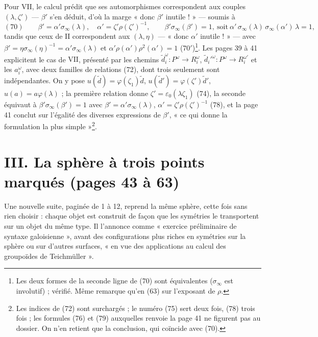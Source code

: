 \documentclass[11pt,a4paper]{article}
\begin{document}
Pour $\mathrm{VII}$, le calcul prédit que ses automorphismes correspondent aux
couples $(\lambda, \zeta')$ — $\beta'$ s'en déduit, d'où la marge « donc
$\beta'$ inutile ! » — soumis à
\[
(70)\qquad \beta' = \alpha'\sigma_\infty(\lambda),\quad \alpha' = \zeta'\rho(\zeta')^{-1}, \qquad \beta'\sigma_\infty(\beta') = 1, \ \text{soit}\ \alpha'\,\sigma_\infty(\lambda)\,\sigma_\infty(\alpha')\,\lambda = 1 ,
\]
tandis que ceux de $\mathrm{II}$ correspondent aux $(\lambda, \eta)$ — « donc
$\alpha'$ inutile ! » — avec $\beta' = \eta\sigma_\infty(\eta)^{-1} =
\alpha'\sigma_\infty(\lambda)$ et $\alpha'\rho(\alpha')\rho^2(\alpha') = 1$
(70$'$)\footnote{Les deux formes de la seconde ligne de (70) sont équivalentes
($\sigma_\infty$ est involutif) ; vérifié. Même remarque qu'en (63) sur
l'exposant de $\rho$.}. Les pages 39 à 41 explicitent le cas de
$\mathrm{VII}$, présenté par les chemins $\tilde d_i^{\omega} : P^{\omega} \to
R_i^{\omega}$, $\tilde d_i'^{\omega} : P^{\omega} \to R_i^{\omega'}$ et les
$a_i^{\omega}$, avec deux familles de relations (72), dont trois seulement
sont indépendantes. On y pose $u(\tilde d) = \varphi(\zeta_1)\tilde d$,
$u(\tilde d') = \varphi(\zeta')\tilde d'$, $u(a) = a\varphi(\lambda)$ ; la
première relation donne $\zeta' = \varepsilon_0(\lambda\zeta_1)$ (74), la
seconde équivaut à $\beta'\sigma_\infty(\beta') = 1$ avec
$\beta' = \alpha'\sigma_\infty(\lambda)$, $\alpha' = \zeta'\rho(\zeta')^{-1}$
(78), et la page 41 conclut sur l'égalité des diverses expressions de
$\beta'$, « ce qui donne la formulation la plus simple »\footnote{Les indices
de (72) sont surchargés ; le numéro (75) sert deux fois, (78) trois fois ; les
formules (76) et (79) auxquelles renvoie la page 41 ne figurent pas au
dossier. On n'en retient que la conclusion, qui coïncide avec (70).}.

\section*{III. La sphère à trois points marqués (pages 43 à 63)}

Une nouvelle suite, paginée de 1 à 12, reprend la même sphère, cette fois sans
rien choisir : chaque objet est construit de façon que les symétries le
transportent sur un objet du même type. Il l'annonce comme « exercice
préliminaire de syntaxe galoisienne », avant des configurations plus riches en
symétries sur la sphère ou sur d'autres surfaces, « en vue des applications au
calcul des groupoïdes de Teichmüller ».

\end{document}
